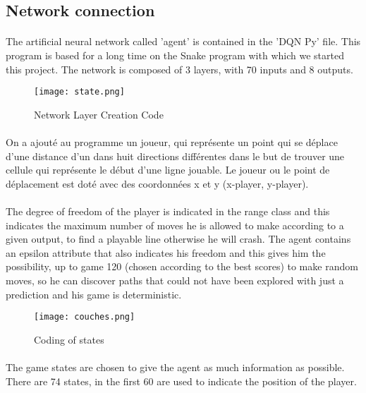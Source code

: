 \documentclass{article}
\begin{document}
\newpage
\subsection{Network connection}
\paragraph{}
\setlength{\parindent}{2cm}
The artificial neural network called 'agent' is contained in the 'DQN Py' file. This program is based for a long time on the Snake program with which we started this project. The network is composed of 3 layers, with 70 inputs and 8 outputs.

\begin{figure}[!h]
\centering
\texttt{[image: state.png]}
\\%
\caption{Network Layer Creation Code}
\end{figure}
\paragraph{}
\setlength{\parindent}{2cm}
On a ajouté au programme un joueur, qui représente un point qui se déplace d'une distance d'un dans huit directions différentes dans le but de trouver une cellule qui représente le début d'une ligne jouable. Le joueur ou le point de déplacement est doté avec des coordonnées x et y (x-player, y-player).
\paragraph{}
\setlength{\parindent}{2cm}
The degree of freedom of the player is indicated in the range class and this indicates the maximum number of moves he is allowed to make according to a given output, to find a playable line otherwise he will crash. The agent contains an epsilon attribute that also indicates his freedom and this gives him the possibility, up to game 120 (chosen according to the best scores) to make random moves, so he can discover paths that could not have been explored with just a prediction and his game is deterministic. 
\begin{figure}[!h]
\centering
\texttt{[image: couches.png]}
\\%
\caption{Coding of states}
\end{figure}

\paragraph{}
\setlength{\parindent}{2cm}
The game states are chosen to give the agent as much information as possible. There are 74 states, in the first 60 are used to indicate the position of the player.
\end{document}
